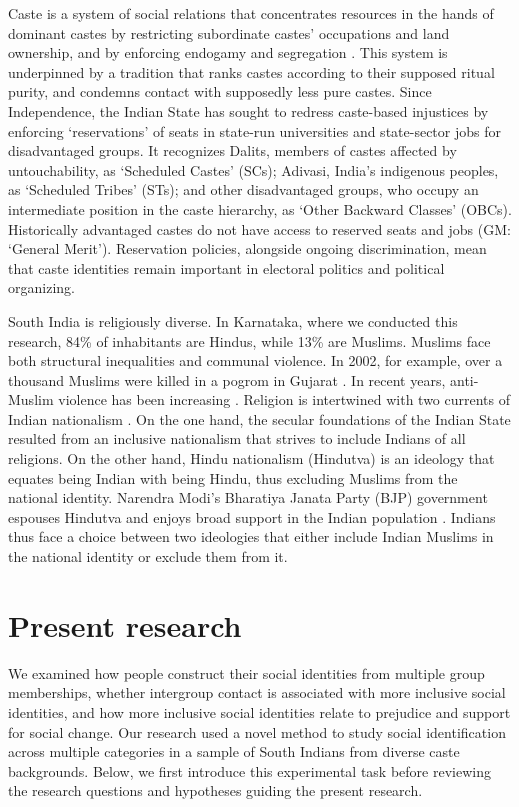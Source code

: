 \documentclass[12pt, a4paper]{article}
\begin{document}
Caste is a system of social relations that concentrates resources in the hands of dominant castes by restricting subordinate castes' occupations and land ownership, and by enforcing endogamy and segregation \cite{jodhka_caste_2012}. This system is underpinned by a tradition that ranks castes according to their supposed ritual purity, and condemns contact with supposedly less pure castes. Since Independence, the Indian State has sought to redress caste-based injustices by enforcing `reservations' of seats in state-run universities and state-sector jobs for disadvantaged groups. It recognizes Dalits, members of castes affected by untouchability, as `Scheduled Castes' (SCs); Adivasi, India's indigenous peoples, as `Scheduled Tribes' (STs); and other disadvantaged groups, who occupy an intermediate position in the caste hierarchy, as `Other Backward Classes' (OBCs). Historically advantaged castes do not have access to reserved seats and jobs (GM: `General Merit'). Reservation policies, alongside ongoing discrimination, mean that caste identities remain important in electoral politics and political organizing.

South India is religiously diverse. In Karnataka, where we conducted this research, 84\% of inhabitants are Hindus, while 13\% are Muslims. Muslims face both structural inequalities and communal violence. In 2002, for example, over a thousand Muslims were killed in a pogrom in Gujarat \cite{dhattiwala_political_2012}. In recent years, anti-Muslim violence has been increasing \cite{amnesty_india_2017}. Religion is intertwined with two currents of Indian nationalism \cite{menski_hindu_2009}. On the one hand, the secular foundations of the Indian State resulted from an inclusive nationalism that strives to include Indians of all religions. On the other hand, Hindu nationalism (Hindutva) is an ideology that equates being Indian with being Hindu, thus excluding Muslims from the national identity. Narendra Modi's Bharatiya Janata Party (BJP) government espouses Hindutva and enjoys broad support in the Indian population \cite{pew_three_2017}. Indians thus face a choice between two ideologies that either include Indian Muslims in the national identity or exclude them from it.

\section{Present research}

We examined how people construct their social identities from multiple group memberships, whether intergroup contact is associated with more inclusive social identities, and how more inclusive social identities relate to prejudice and support for social change. Our research used a novel method to study social identification across multiple categories in a sample of South Indians from diverse caste backgrounds. Below, we first introduce this experimental task before reviewing the research questions and hypotheses guiding the present research.
\end{document}
